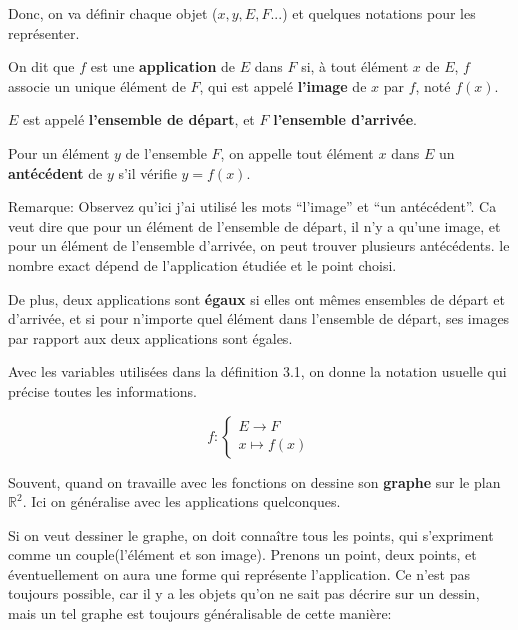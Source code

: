 \documentclass{article}
\begin{document}
Donc, on va définir chaque objet ($x, y, E, F...$) et quelques notations pour les représenter.

\begin{tcolorbox}[colback=red!5!white,colframe=red!75!black,title=Définition 3.1]

On dit que $f$ est une \textbf{application} de $E$ dans $F$ si, à tout élément $x$ de $E$, $f$ associe un unique élément de $F$, qui est appelé \textbf{l'image} de $x$ par $f$, noté $f(x)$.

$E$ est appelé \textbf{l'ensemble de départ}, et $F$ \textbf{l'ensemble d'arrivée}.

Pour un élément $y$ de l'ensemble $F$, on appelle tout élément $x$ dans $E$ un \textbf{antécédent} de $y$ s'il vérifie $y=f(x)$.


\end{tcolorbox}

Remarque: Observez qu'ici j'ai utilisé les mots ``l'image'' et ``un antécédent''. Ca veut dire que pour un élément de l'ensemble de départ, il n'y a qu'une image, et pour un élément de l'ensemble d'arrivée, on peut trouver plusieurs antécédents. le nombre exact dépend de l'application étudiée et le point choisi.

De plus, deux applications sont \textbf{égaux} si elles ont mêmes ensembles de départ et d'arrivée, et si pour n'importe quel élément dans l'ensemble de départ, ses images par rapport aux deux applications sont égales.

\begin{tcolorbox}[colback=yellow!5!white,colframe=yellow!75!black,title=Notation 3.1]

Avec les variables utilisées dans la définition 3.1, on donne la notation usuelle qui précise toutes les informations.

\[
f : 
\begin{cases} 
E \to F \\
x \mapsto f(x)
\end{cases}
\]

\end{tcolorbox}

Souvent, quand on travaille avec les fonctions on dessine son \textbf{graphe} sur le plan $\mathbb{R}^{2}$. Ici on généralise avec les applications quelconques.

Si on veut dessiner le graphe, on doit connaître tous les points, qui s'expriment comme un couple(l'élément et son image). Prenons un point, deux points, et éventuellement on aura une forme qui représente l'application. Ce n'est pas toujours possible, car il y a les objets qu'on ne sait pas décrire sur un dessin, mais un tel graphe est toujours généralisable de cette manière:
\end{document}
